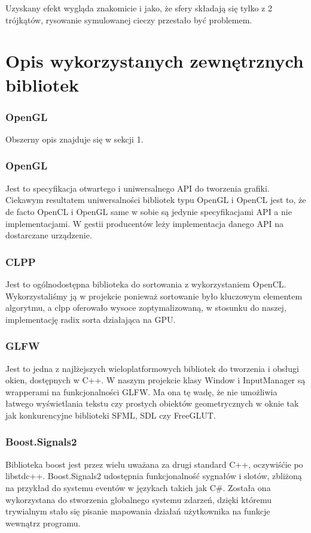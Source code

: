 \documentclass[polish, 12pt]{aghthesis}
\begin{document}
		Uzyskany efekt wygląda znakomicie i jako, że sfery składają się tylko z 2 trójkątów, rysowanie symulowanej cieczy przestało być problemem.
		
\section{Opis wykorzystanych zewnętrznych bibliotek}
	
	\subsubsection*{OpenGL}
		Obszerny opis znajduje się w sekcji 1.

	\subsubsection*{OpenGL}
			Jest to specyfikacja otwartego i uniwersalnego API do tworzenia grafiki. Ciekawym resultatem uniwersalności bibliotek typu OpenGL i OpenCL jest to, że de facto OpenCL i OpenGL same w sobie są jedynie specyfikacjami API a nie implementacjami. W gestii producentów leży implementacja danego API na dostarczane urządzenie.

	\subsubsection*{CLPP}
				 Jest to ogólnodostępna biblioteka do sortowania z wykorzystaniem OpenCL. Wykorzystaliśmy ją w projekcie ponieważ sortowanie było kluczowym elementem algorytmu, a clpp oferowało wysoce zoptymalizowaną, w stosunku do naszej, implementację radix sorta działająca na GPU.

	\subsubsection*{GLFW}
				 Jest to jedna z najlżejszych wieloplatformowych bibliotek do tworzenia i obsługi okien, dostępnych w C++. W naszym projekcie klasy Window i InputManager są wrapperami na funkcjonalności GLFW. Ma ona tę wadę, że nie umożliwia łatwego wyświetlania tekstu czy prostych obiektów geometrycznych w oknie tak jak konkurencyjne biblioteki SFML, SDL czy FreeGLUT. 

	\subsubsection*{Boost.Signals2}
				 Biblioteka boost jest przez wielu uważana za drugi standard C++, oczywiśćie po libstdc++. Boost.Signals2 udostępnia funkcjonalność sygnałów i slotów, zbliżoną na przykład do systemu eventów w językach takich jak C\#. Została ona wykorzystana do stworzenia globalnego systemu zdarzeń, dzięki któremu trywialnym stało się pisanie mapowania działań użytkownika na funkcje wewnątrz programu. 


	\clearpage
	
	\nocite{OpenCLProgrammingGuide,GameCodingComplete,CLPP,SPHWebinar,Impostor}
	
	
\end{document}
